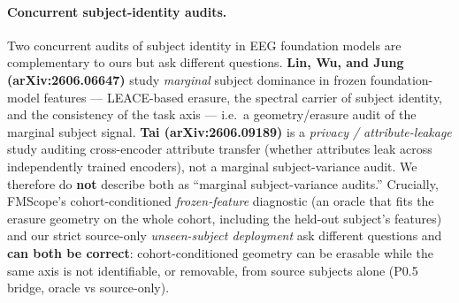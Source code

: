 {\sloppy
\paragraph{Concurrent subject-identity audits.}
Two concurrent audits of subject identity in EEG foundation models are complementary to ours but ask
different questions. \textbf{Lin, Wu, and Jung (arXiv:2606.06647)} study \emph{marginal} subject dominance
in frozen foundation-model features --- LEACE-based erasure, the spectral carrier of subject identity, and
the consistency of the task axis --- i.e.\ a geometry/erasure audit of the marginal subject signal.
\textbf{Tai (arXiv:2606.09189)} is a \emph{privacy / attribute-leakage} study auditing cross-encoder
attribute transfer (whether attributes leak across independently trained encoders), not a marginal
subject-variance audit. We therefore do \textbf{not} describe both as ``marginal subject-variance audits.''
Crucially, FMScope's cohort-conditioned \emph{frozen-feature} diagnostic (an oracle that fits the erasure
geometry on the whole cohort, including the held-out subject's features) and our strict source-only
\emph{unseen-subject deployment} ask different questions and \textbf{can both be correct}: cohort-conditioned
geometry can be erasable while the same axis is not identifiable, or removable, from source subjects alone
(P0.5 bridge, oracle vs source-only).\par}
